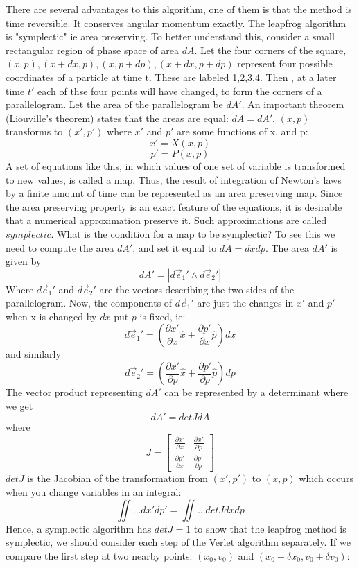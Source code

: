 \documentclass[12pt]{article}
\begin{document}
There are several advantages to this algorithm, one of them is that the method is time reversible. It conserves angular momentum exactly. The leapfrog algorithm is "symplectic" ie area preserving. To better understand this, consider a small rectangular region of phase space of area $dA$. Let the four corners of the square, $(x,p),(x+dx,p),(x,p+dp),(x+dx,p+dp)$ represent four possible coordinates of a particle at time t. These are labeled 1,2,3,4. Then , at a later time $t'$ each of thse four points will have changed, to form the corners of a parallelogram. Let the area of the parallelogram be $dA'$. An important theorem (Liouville's theorem) states that the areas are equal: $dA=dA'$. $(x,p)$ transforms to $(x',p')$ where $x'$ and $p'$ are some functions of x, and p:
$$x'=X(x,p)$$
$$p'=P(x,p)$$
A set of equations like this, in which values of one set of variable is transformed to new values, is called a map. Thus, the result of integration of Newton's laws by a finite amount of time can be represented as an area preserving map. Since the area preserving property is an exact feature of the equations, it is desirable that a numerical approximation preserve it. Such approximations are called $\textit{symplectic}$. What is the condition for a map to be symplectic? To see this we need to compute the area $dA'$, and set it equal to $dA=dxdp$. The area $dA'$ is given by 
$$dA'=|d\vec{e}_1'\wedge d\vec{e}_2'|$$
Where $d\vec{e}_1'$ and $d\vec{e}_2'$ are the vectors describing the two sides of the parallelogram. Now, the components of $d\vec{e}_1'$ are just the changes in $x'$ and $p'$ when x is changed by $dx$ put $p$ is fixed, ie:
$$d\vec{e}_1'=\left(\frac{\partial x'}{\partial x}\hat{x}+\frac{\partial p'}{\partial x}\hat{p}\right)dx$$
and similarly
$$d\vec{e}_2'=\left(\frac{\partial x'}{\partial p}\hat{x}+\frac{\partial p'}{\partial p}\hat{p}\right)dp$$
The vector product representing $dA'$ can be represented by a determinant where we get
$$dA'=det JdA$$
where
$$J=\begin{bmatrix}
\frac{\partial x'}{\partial x} & \frac{\partial x'}{\partial p}\\
\frac{\partial p'}{\partial x} & \frac{\partial p'}{\partial p}
\end{bmatrix}$$
$det J$ is the Jacobian of the transformation from $(x',p')$ to $(x,p)$ which occurs when you change variables in an integral:
$$\iint\dots dx'dp'=\iint\dots detJ dx dp$$
Hence, a symplectic algorithm has $detJ=1$ to show that the leapfrog method is symplectic, we should consider each step of the Verlet algorithm separately. If we compare the first step at two nearby points: $(x_0,v_0)$ and $(x_0+\delta x_0,v_0+\delta v_0)$:
\end{document}
